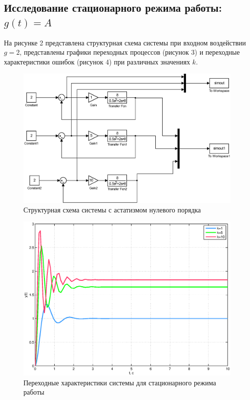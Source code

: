 \documentclass[12pt,a4paper]{article}
\begin{document}
\subsection{Исследование стационарного режима работы: $g(t)=A$} 
На рисунке 2 представлена структурная схема системы при входном воздействии \\$g=2$, представлены графики переходных процессов (рисунок 3) и переходные характеристики ошибок (рисунок 4) при различных значениях $k$. 
\begin{figure}[h!]
	\centering
	\includegraphics[width=1\linewidth]{scheme/scheme1.eps}
	\caption{Структурная схема системы с астатизмом нулевого порядка}
\end{figure}
\begin{figure}[H]
	\centering
	\includegraphics[width=0.8\linewidth]{scheme/plot1.eps}
	\caption{Переходные характеристики системы для стационарного режима работы}
\end{figure}
\end{document}
